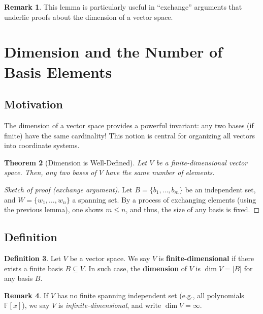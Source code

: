\documentclass[11pt]{article}
\theoremstyle{definition}
\newtheorem{definition}{Definition}[section]
\newtheorem{remark}[definition]{Remark}
\theoremstyle{plain}
\newtheorem{theorem}[definition]{Theorem}
\begin{document}
\begin{remark}
This lemma is particularly useful in ``exchange'' arguments that underlie proofs about the dimension of a vector space.
\end{remark}

\section{Dimension and the Number of Basis Elements}

\subsection{Motivation}
The dimension of a vector space provides a powerful invariant: any two bases (if finite) have the same cardinality! This notion is central for organizing all vectors into coordinate systems.

\begin{theorem}[Dimension is Well-Defined]
Let $V$ be a finite-dimensional vector space. Then, any two bases of $V$ have the same number of elements.
\end{theorem}

\begin{proof}[Sketch of proof (exchange argument)]
Let $B = \{b_1, \dots, b_m\}$ be an independent set, and $W = \{w_1, \dots, w_n\}$ a spanning set. By a process of exchanging elements (using the previous lemma), one shows $m \leq n$, and thus, the size of any basis is fixed.
\end{proof}

\subsection{Definition}

\begin{definition}
Let $V$ be a vector space. We say $V$ is \textbf{finite-dimensional} if there exists a finite basis $B \subseteq V$. In such case, the \textbf{dimension} of $V$ is $\dim V = |B|$ for any basis $B$.
\end{definition}

\begin{remark}
If $V$ has no finite spanning independent set (e.g., all polynomials $\mathbb{F}[x]$), we say $V$ is \emph{infinite-dimensional}, and write $\dim V = \infty$.
\end{remark}
\end{document}
